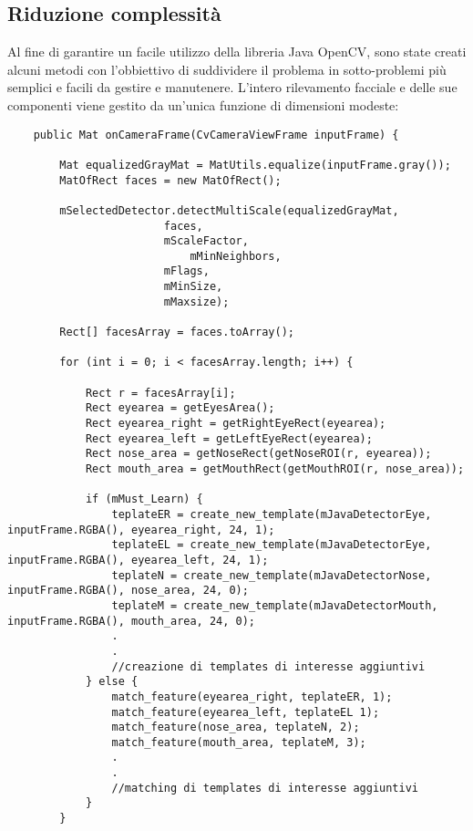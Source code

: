 \subsection{Riduzione complessità}

Al fine di garantire un facile utilizzo della libreria Java OpenCV, sono state creati alcuni metodi con l'obbiettivo di suddividere il problema in sotto-problemi più semplici e facili da gestire e manutenere. L'intero rilevamento facciale e delle sue componenti viene gestito da un'unica funzione di dimensioni modeste:

\begin{lstlisting}
	public Mat onCameraFrame(CvCameraViewFrame inputFrame) {
		
		Mat equalizedGrayMat = MatUtils.equalize(inputFrame.gray());
		MatOfRect faces = new MatOfRect();
		
		mSelectedDetector.detectMultiScale(equalizedGrayMat, 
						faces, 
						mScaleFactor,
					        mMinNeighbors,
						mFlags, 
						mMinSize,
						mMaxsize);
						
		Rect[] facesArray = faces.toArray();

		for (int i = 0; i < facesArray.length; i++) {
			
			Rect r = facesArray[i];
			Rect eyearea = getEyesArea();
			Rect eyearea_right = getRightEyeRect(eyearea);
			Rect eyearea_left = getLeftEyeRect(eyearea);
			Rect nose_area = getNoseRect(getNoseROI(r, eyearea));
			Rect mouth_area = getMouthRect(getMouthROI(r, nose_area));

			if (mMust_Learn) {
				teplateER = create_new_template(mJavaDetectorEye, inputFrame.RGBA(), eyearea_right, 24, 1);
				teplateEL = create_new_template(mJavaDetectorEye, inputFrame.RGBA(), eyearea_left, 24, 1);
				teplateN = create_new_template(mJavaDetectorNose, inputFrame.RGBA(), nose_area, 24, 0);
				teplateM = create_new_template(mJavaDetectorMouth, inputFrame.RGBA(), mouth_area, 24, 0);
				.
				.
				//creazione di templates di interesse aggiuntivi
			} else {
			    match_feature(eyearea_right, teplateER, 1);
				match_feature(eyearea_left, teplateEL 1);
				match_feature(nose_area, teplateN, 2);
				match_feature(mouth_area, teplateM, 3); 
				.
				.
				//matching di templates di interesse aggiuntivi
			}
		}
\end{lstlisting}

